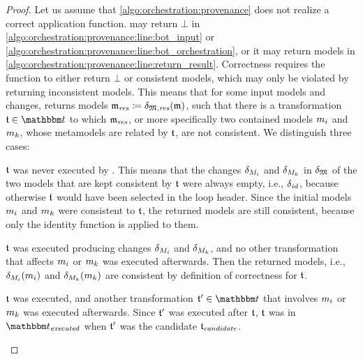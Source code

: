 \begin{proof}
    Let us assume that \autoref{algo:orchestration:provenance} does not realize a correct application function.
     may return $\bot$ in \autoref{algo:orchestration:provenance:line:bot_input} or \autoref{algo:orchestration:provenance:line:bot_orchestration}, or it may return models in \autoref{algo:orchestration:provenance:line:return_result}.
    Correctness requires the function to either return $\bot$ or consistent models, which may only be violated by  returning inconsistent models.
    This means that for some input models and changes,  returns models $\modeltuple{m}_\mathvariable{res} \equalsperdefinition \changetuple{\metamodeltuple{M},\mathvariable{res}}(\modeltuple{m})$, such that there is a transformation $\transformation{t} \in \transformationset{T}$ to which $\modeltuple{m}_\mathvariable{res}$, or more specifically two contained models $\model{m}{i}$ and $\model{m}{k}$, whose metamodels are related by $\transformation{t}$, are not consistent.
    We distinguish three cases:
    \begin{longenumerate}
        \item $\transformation{t}$ was never executed by . This means that the changes $\change{\metamodel{M}{i}}$ and $\change{\metamodel{M}{k}}$ in $\change{\metamodeltuple{M}}$ of the two models that are kept consistent by $\transformation{t}$ were always empty, i.e., $\delta_{\mathit{id}}$, because otherwise $\transformation{t}$ would have been selected in the loop header. Since the initial models $\model{m}{i}$ and $\model{m}{k}$ were consistent to $\transformation{t}$, the returned models are still consistent, because only the identity function is applied to them.
        \item $\transformation{t}$ was executed producing changes $\change{\metamodel{M}{i}}$ and $\change{\metamodel{M}{k}}$, and no other transformation that affects $\model{m}{i}$ or $\model{m}{k}$ was executed afterwards. Then the returned models, i.e., $\change{\metamodel{M}{i}}(\model{m}{i})$ and $\change{\metamodel{M}{k}}(\model{m}{k})$ are consistent by definition of correctness for $\transformation{t}$.
        \item $\transformation{t}$ was executed, and another transformation $\transformation{t}' \in \transformationset{T}$ that involves $\model{m}{i}$ or $\model{m}{k}$ was executed afterwards.
        Since $\transformation{t}'$ was executed after $\transformation{t}$, $\transformation{t}$ was in $\provalgexecuted$ when $\transformation{t}'$ was the candidate $\provalgcandidate$.

\end{longenumerate}
\end{proof}
